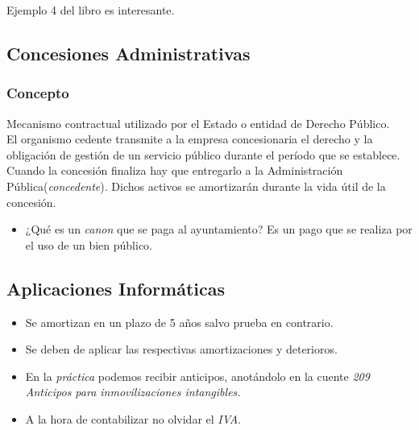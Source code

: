 \documentclass[a4paper,12pt]{article}
\begin{document}
\begin{tcolorbox}[colback=green!5!white,colframe=blue!75!black, title=Nota]
Ejemplo 4 del libro es interesante.
\end{tcolorbox}

\subsection{Concesiones Administrativas}
\subsubsection{Concepto}
Mecanismo contractual utilizado por el Estado o entidad de Derecho Público.\\

El organismo cedente transmite a la empresa concesionaria el derecho y la obligación de gestión de un servicio público durante el período que se establece.\\

Cuando la concesión finaliza hay que entregarlo a la Administración Pública(\textit{concedente}). Dichos activos se amortizarán durante la vida útil de la concesión.\\

\begin{tcolorbox}[colback=yellow!5!white,colframe=yellow!75!black, title=Nota]
\begin{itemize}
    \item ¿Qué es un \textit{canon} que se paga al ayuntamiento? Es un pago que se realiza por el uso de un bien público.
\end{itemize}
\end{tcolorbox}


\subsection{Aplicaciones Informáticas}

\begin{itemize}
\item Se amortizan en un plazo de 5 años salvo prueba en contrario.\\

\item Se deben de aplicar las respectivas amortizaciones y deterioros.\\

\item  En la \textit{práctica} podemos recibir anticipos, anotándolo en la cuente \textit{209 Anticipos para inmovilizaciones intangibles.}

\item A la hora de contabilizar no olvidar el \textit{IVA}.
\end{itemize}
\end{document}
